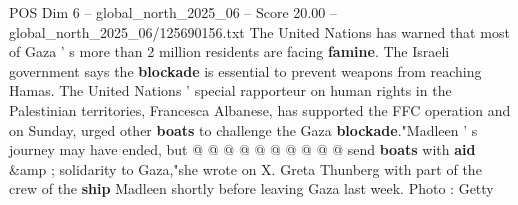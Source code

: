 \begin{textsample}{POS Dim 6 – global\_north\_2025\_06 – Score 20.00 – global\_north\_2025\_06/125690156.txt}
The United Nations has warned that most of Gaza ' s more than 2 million residents are facing \textbf{famine}.
The Israeli government says the \textbf{blockade} is essential to prevent weapons from reaching Hamas.
The United Nations ' special rapporteur on human rights in the Palestinian territories, Francesca Albanese, has supported the FFC operation and on Sunday, urged other \textbf{boats} to challenge the Gaza \textbf{blockade}."Madleen ' s journey may have ended, but @ @ @ @ @ @ @ @ @ @ send \textbf{boats} with \textbf{aid} \&amp ; solidarity to Gaza,"she wrote on X.
Greta Thunberg with part of the crew of the \textbf{ship} Madleen shortly before leaving Gaza last week.
Photo : Getty

\end{textsample}
